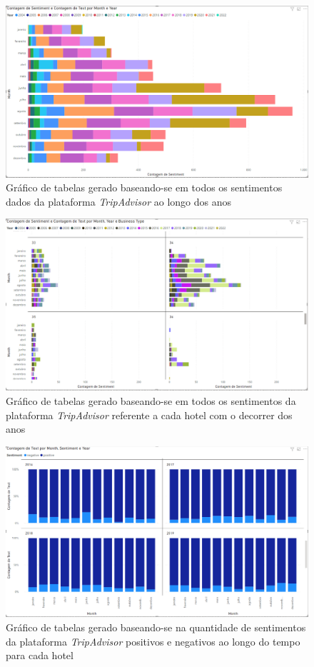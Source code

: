 \begin{figure}[!htb]
\centering
\includegraphics[width=14cm]{figuras/NrReviewsPerYear/TableGraph6.PNG}
\caption{Gráfico de tabelas gerado baseando-se em todos os sentimentos dados da plataforma \textit{TripAdvisor} ao longo dos anos}
\label{fig:exemplofigqntsntmyear}
\end{figure}

\begin{figure}[!htb]
\centering
\includegraphics[width=14cm]{figuras/NrReviewsPerYear&BusinessType/8.PNG}
\caption{Gráfico de tabelas gerado baseando-se em todos os sentimentos da plataforma \textit{TripAdvisor} referente a cada hotel com o decorrer dos anos}
\label{fig:exemplofigqntyearbus}
\end{figure}

\begin{figure}[!htb]
\centering
\includegraphics[width=14cm]{figuras/Pos&NegSentiments/TableGraph4.PNG}
\caption{Gráfico de tabelas gerado baseando-se na quantidade de sentimentos da plataforma \textit{TripAdvisor} positivos e negativos ao longo do tempo para cada hotel}
\label{fig:exemplofigposneg}
\end{figure}